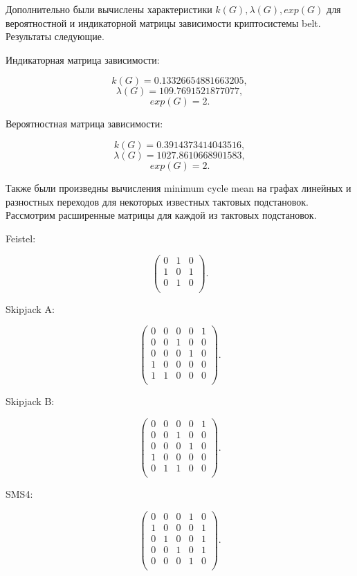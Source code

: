 \documentclass[a4paper,12pt]{report}
\theoremstyle{plain} %
\theoremstyle{definition}
\theoremstyle{remark}
\begin{document}
\begin{large}
Дополнительно были вычислены характеристики $k(G), \lambda(G), exp(G)$ для вероятностной и индикаторной матрицы зависимости криптосистемы belt. Результаты следующие.

Индикаторная матрица зависимости:

$$k(G) = 0.13326654881663205,$$
$$\lambda(G) = 109.7691521877077,$$
$$exp(G) = 2.$$

Вероятностная матрица зависимости:

$$k(G) = 0.3914373414043516,$$
$$\lambda(G) = 1027.8610668901583,$$
$$exp(G) = 2.$$

Также были произведны вычисления minimum cycle mean на графах линейных и разностных переходов для некоторых известных тактовых подстановок. Рассмотрим расширенные матрицы для каждой из тактовых подстановок.

Feistel:

$$
\begin{pmatrix}
0 & 1 & 0\\
1 & 0 & 1\\
0 & 1 & 0\\
\end{pmatrix}.
$$

Skipjack A:

$$
\begin{pmatrix}
0 & 0 & 0 & 0 & 1\\
0 & 0 & 1 & 0 & 0\\
0 & 0 & 0 & 1 & 0\\
1 & 0 & 0 & 0 & 0\\
1    & 1    & 0 & 0    & 0\\
\end{pmatrix}.
$$

Skipjack B:

$$
\begin{pmatrix}
0 & 0 & 0 & 0 & 1\\
0 & 0 & 1 & 0 & 0\\
0 & 0 & 0 & 1 & 0\\
1 & 0 & 0 & 0 & 0\\
0    & 1    & 1 & 0    & 0\\
\end{pmatrix}.
$$

SMS4:

$$
\begin{pmatrix}
0 & 0 & 0 & 1 & 0\\
1 & 0 & 0 & 0 & 1\\
0 & 1 & 0 & 0 & 1\\
0 & 0 & 1 & 0 & 1\\
0 & 0 & 0 & 1 & 0\\
\end{pmatrix}.
$$


\end{large}
\end{document}
